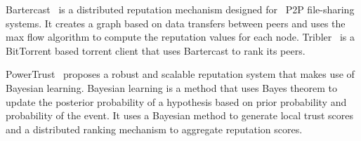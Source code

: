 Bartercast~\cite{meulpolder2009bartercast} is a distributed reputation
mechanism designed for ~\ac{P2P} file-sharing systems. It creates a graph based on
data transfers between peers and uses the max flow algorithm to compute the
reputation values for each node. Tribler~\cite{pouwelse2008tribler} is a
BitTorrent based torrent client that uses Bartercast to rank its peers.  

PowerTrust~\cite{zhou2007powertrust} proposes a robust and scalable reputation
system that makes use of Bayesian learning. Bayesian learning is a method that
uses Bayes theorem to update the posterior probability of a hypothesis based on
prior probability and probability of the event. It uses a Bayesian method to
generate local trust scores and a distributed ranking mechanism to aggregate
reputation scores. 

